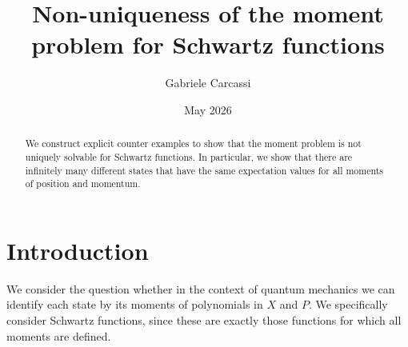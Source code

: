 \documentclass{techbrief}
\title{Non-uniqueness of the moment problem for Schwartz functions}
\author{Gabriele Carcassi}
\date{May 2026}
\begin{document}
	
\maketitle
	
\begin{abstract}
	We construct explicit counter examples to show that the moment problem is not uniquely solvable for Schwartz functions. In particular, we show that there are infinitely many different states that have the same expectation values for all moments of position and momentum.
\end{abstract}

\section{Introduction}
We consider the question whether in the context of quantum mechanics we can identify each state by its moments of polynomials in $X$ and $P$. We specifically consider Schwartz functions, since these are exactly those functions for which all moments are defined.
\end{document}
